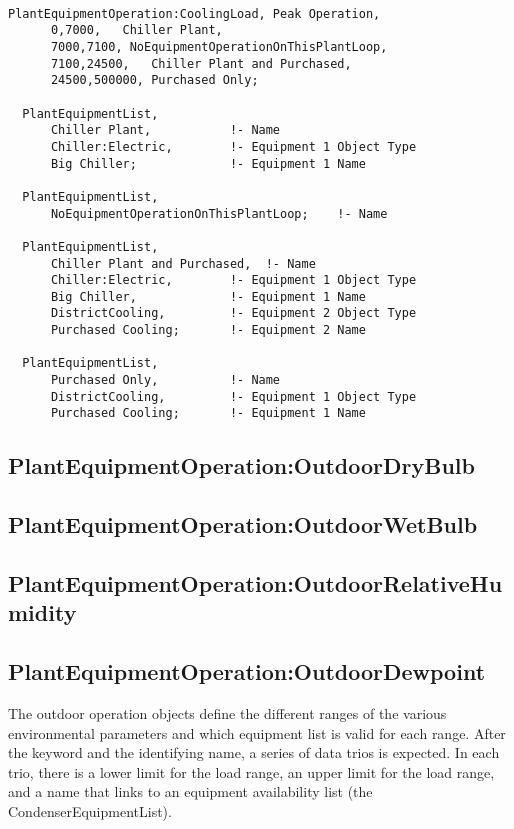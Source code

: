 \begin{lstlisting}

PlantEquipmentOperation:CoolingLoad, Peak Operation,
      0,7000,   Chiller Plant,
      7000,7100, NoEquipmentOperationOnThisPlantLoop,
      7100,24500,   Chiller Plant and Purchased,
      24500,500000, Purchased Only;

  PlantEquipmentList,
      Chiller Plant,           !- Name
      Chiller:Electric,        !- Equipment 1 Object Type
      Big Chiller;             !- Equipment 1 Name

  PlantEquipmentList,
      NoEquipmentOperationOnThisPlantLoop;    !- Name

  PlantEquipmentList,
      Chiller Plant and Purchased,  !- Name
      Chiller:Electric,        !- Equipment 1 Object Type
      Big Chiller,             !- Equipment 1 Name
      DistrictCooling,         !- Equipment 2 Object Type
      Purchased Cooling;       !- Equipment 2 Name

  PlantEquipmentList,
      Purchased Only,          !- Name
      DistrictCooling,         !- Equipment 1 Object Type
      Purchased Cooling;       !- Equipment 1 Name
\end{lstlisting}

\subsection{PlantEquipmentOperation:OutdoorDryBulb}\label{plantequipmentoperationoutdoordrybulb}

\subsection{PlantEquipmentOperation:OutdoorWetBulb}\label{plantequipmentoperationoutdoorwetbulb}

\subsection{PlantEquipmentOperation:OutdoorRelativeHumidity}\label{plantequipmentoperationoutdoorrelativehumidity}

\subsection{PlantEquipmentOperation:OutdoorDewpoint}\label{plantequipmentoperationoutdoordewpoint}

The outdoor operation objects define the different ranges of the various environmental parameters and which equipment list is valid for each range. After the keyword and the identifying name, a series of data trios is expected. In each trio, there is a lower limit for the load range, an upper limit for the load range, and a name that links to an equipment availability list (the CondenserEquipmentList).

